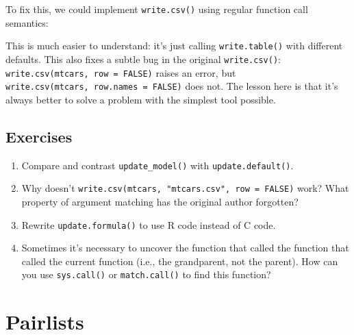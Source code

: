 To fix this, we could implement \texttt{write.csv()} using regular
function call semantics:

\begin{Shaded}
\begin{Highlighting}[]
\StringTok{ } \NormalTok{, } \NormalTok{, } \NormalTok{, }
  \NormalTok{(}
\NormalTok{\}}
\end{Highlighting}
\end{Shaded}

This is much easier to understand: it's just calling
\texttt{write.table()} with different defaults. This also fixes a subtle
bug in the original \texttt{write.csv()}:
\texttt{write.csv(mtcars,\ row\ =\ FALSE)} raises an error, but
\texttt{write.csv(mtcars,\ row.names\ =\ FALSE)} does not. The lesson
here is that it's always better to solve a problem with the simplest
tool possible.

\hypertarget{exercises-3}{%
\subsection{Exercises}\label{exercises-3}}

\begin{enumerate}
\def\labelenumi{\arabic{enumi}.}
\item
  Compare and contrast \texttt{update\_model()} with
  \texttt{update.default()}.
\item
  Why doesn't \texttt{write.csv(mtcars,\ "mtcars.csv",\ row\ =\ FALSE)}
  work? What property of argument matching has the original author
  forgotten?
\item
  Rewrite \texttt{update.formula()} to use R code instead of C code.
\item
  Sometimes it's necessary to uncover the function that called the
  function that called the current function (i.e., the grandparent, not
  the parent). How can you use \texttt{sys.call()} or
  \texttt{match.call()} to find this function?
\end{enumerate}

\hypertarget{pairlists}{%
\section{Pairlists}\label{pairlists}}

